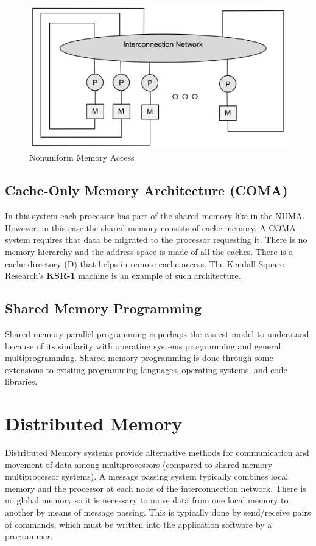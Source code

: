 \documentclass[11pt]{article}
\begin{document}
\begin{figure}[htp]
\centering
\includegraphics[scale=0.20]{numa.png}
\caption{Nonuniform Memory Access}
\end{figure}


\subsection{Cache-Only Memory Architecture (COMA)}
In this system each processor has part of the shared memory like in the NUMA.
However, in this case the shared memory consists of cache memory. A COMA
system requires that data be migrated to the processor requesting it. There is no memory hierarchy and the address space is made of all the caches. There is a cache directory (D) that helps in remote cache access. The Kendall Square Research’s \textbf{KSR-1} machine is an example of such architecture.



\subsection{Shared Memory Programming}
Shared memory parallel programming is perhaps the easiest model to understand
because of its similarity with operating systems programming and general multiprogramming. Shared memory programming is done through some extensions to existing programming languages, operating systems, and code libraries.


\section{Distributed Memory}
Distributed Memory systems provide alternative methods for communication and
movement of data among multiprocessors (compared to shared memory multiprocessor systems). A message passing system typically combines local memory and the processor at each node of the interconnection network. There is no global memory so it is necessary to move data from one local memory to another by means of message passing. This is typically done by send/receive pairs of commands, which must be written into the application software by a programmer.
\end{document}

